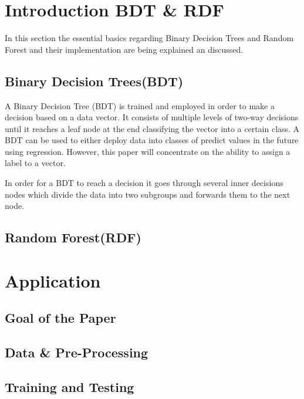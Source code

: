 \documentclass[
12pt,
headsepline,
bibliography=totoc,
twoside=semi,
fleqn
]{scrartcl}
\begin{document}
\newpage


\section{Introduction BDT \& RDF\label{sec:sec2}}
In this section the essential basics regarding Binary Decision Trees and Random Forest and their implementation are being explained an discussed.

  \subsection{Binary Decision Trees(BDT)\label{sec:sec2-1}}
  A Binary Decision Tree (BDT) is trained and employed in order to make a decision based on a data vector. It consists of multiple levels of two-way decisions until it reaches a leaf node at the end classifying the vector into a certain class. A BDT can be used to either deploy data into classes of predict values in the future using regression. However, this paper will concentrate on the ability to assign a label to a vector. 

  In order for a BDT to reach a decision it goes through several inner decisions nodes which divide the data into two subgroups and forwards them to the next node.  



  \subsection{Random Forest(RDF)\label{sec:sec2-2}}

\section{Application\label{sec:sec3}}

  \subsection{Goal of the Paper\label{sec:sec3-1}}
  \subsection{Data \& Pre-Processing\label{sec:sec3-2}}
  \subsection{Training and Testing\label{sec:sec3-3}}
\end{document}
